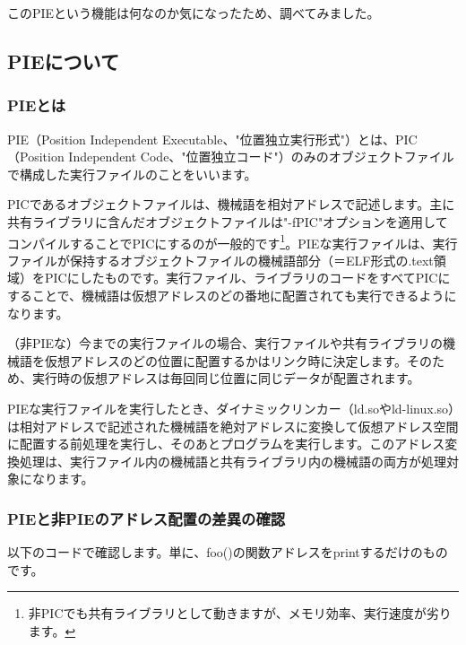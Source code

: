 \documentclass[mingoth,a4paper]{jsarticle}
\begin{document}
このPIEという機能は何なのか気になったため、調べてみました。


\subsection{PIEについて}

\subsubsection{PIEとは}

PIE（Position Independent Executable、"位置独立実行形式"）とは、PIC（Position Independent Code、"位置独立コード"）のみのオブジェクトファイルで構成した実行ファイルのことをいいます。


PICであるオブジェクトファイルは、機械語を相対アドレスで記述します。主に共有ライブラリに含んだオブジェクトファイルは"-fPIC"オプションを適用してコンパイルすることでPICにするのが一般的です\footnote{非PICでも共有ライブラリとして動きますが、メモリ効率、実行速度が劣ります。}。PIEな実行ファイルは、実行ファイルが保持するオブジェクトファイルの機械語部分（＝ELF形式の.text領域）をPICにしたものです。実行ファイル、ライブラリのコードをすべてPICにすることで、機械語は仮想アドレスのどの番地に配置されても実行できるようになります。


（非PIEな）今までの実行ファイルの場合、実行ファイルや共有ライブラリの機械語を仮想アドレスのどの位置に配置するかはリンク時に決定します。そのため、実行時の仮想アドレスは毎回同じ位置に同じデータが配置されます。


PIEな実行ファイルを実行したとき、ダイナミックリンカー（ld.soやld-linux.so）は相対アドレスで記述された機械語を絶対アドレスに変換して仮想アドレス空間に配置する前処理を実行し、そのあとプログラムを実行します。このアドレス変換処理は、実行ファイル内の機械語と共有ライブラリ内の機械語の両方が処理対象になります。


\subsubsection{PIEと非PIEのアドレス配置の差異の確認}

以下のコードで確認します。単に、foo()の関数アドレスをprintするだけのものです。

\end{document}
